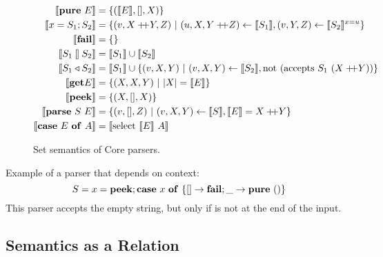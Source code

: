 \documentclass{article}
\begin{document}
\begin{figure}[H]
\begin{align*}
\sem {\gPure E} &= \set{ (\sem E, [], X) } \\
\sem {\gBind x {S_1} {S_2}} &=
  \set{ (v,X \append Y,Z) ~|~ (u,X,Y \append Z) \from \sem{S_1},
                              (v,Y,Z)           \from \sem{S_2}^{x=u} } \\
\sem{\gFail} &= \set{ } \\
\sem{\gOr {S_1} {S_2}} &= \sem{S_1} \union \sem{S_2} \\
\sem{\gOrB {S_1} {S_2}} &= \sem{S_1} \union
  \set { (v,X,Y) ~|~ (v,X,Y) \from \sem{S_2},
                     \fun{not} (\fun{accepts} S_1~(X \append Y)) } \\
\sem{\gGet E} &= \set{ (X, X, Y) ~|~ |X| = \sem{E} } \\
\sem{\gGetS}  &= \set{ (X, [], X) } \\
\sem{\gParse S E} &= \set{ (v,[],Z) ~|~ (v,X,Y) \from \sem{S},
                                        \sem{E} = X \append Y } \\
\sem{\gCase E A} &= \sem{ \fun{select} \sem{E}~A }
\end{align*}
\caption{Set semantics of Core parsers.}
\end{figure}

Example of a parser that depends on context:
\begin{equation*}
S = {x} = {\mathbf{peek}}; {\mathbf{case}~{x}~\mathbf{of}~{\{{[] \to \mathbf{fail}; \_ \to \mathbf{pure}~{()}}\}}}
\end{equation*}
This parser accepts the empty string, but only if is not at the end
of the input.


\subsection{Semantics as a Relation}
\end{document}
